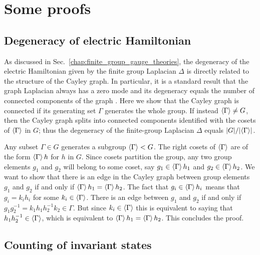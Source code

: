 \chapter{Some proofs}
\label{sec:some_proofs}

\section{Degeneracy of electric Hamiltonian}
\label{sec:laplacian degeneracy}

As discussed in Sec.~\ref{chap:finite_group_gauge_theories}, the degeneracy of the electric Hamiltonian given by the finite group Laplacian $\Delta$ is directly related to the structure of the Cayley graph.
In particular, it is a standard result that the graph Laplacian always has a zero mode and its degeneracy equals the number of connected components of the graph \cite{spectralgraphtheory}.
Here we show that the Cayley graph is connected if its generating set $\Gamma$ generates the whole group.
If instead $\expval{\Gamma} \neq G$, then the Cayley graph splits into connected components identified with the cosets of $\expval{\Gamma}$ in $G$; thus the degeneracy of the finite-group Laplacian $\Delta$ equals $\abs{G}/\abs{\expval{\Gamma}}$.

Any subset $\Gamma \in G$ generates a subgroup $\expval{\Gamma} < G$.
The right cosets of $\expval{\Gamma}$ are of the form $\expval{\Gamma} h$ for $h$ in $G$.
Since cosets partition the group, any two group elements $g_1$ and $g_2$ will belong to some coset, say $g_1 \in \expval{\Gamma} h_1$ and $g_2 \in \expval{\Gamma} h_2$.
We want to show that there is an edge in the Cayley graph between group elements $g_1$ and $g_2$ if and only if $\expval{\Gamma} h_1 = \expval{\Gamma} h_2$.
The fact that $g_i \in \expval{\Gamma} h_i$ means that $g_i = k_i h_i$ for some $k_i \in \expval{\Gamma}$.
There is an edge between $g_1$ and $g_2$ if and only if $g_1 g_2^{-1} = k_1 h_1 h_2^{-1} k_2 \in \Gamma$.
But since $k_i \in \expval{\Gamma}$ this is equivalent to saying that $h_1 h_2^{-1} \in \expval{\Gamma}$, which is equivalent to $\expval{\Gamma} h_1 = \expval{\Gamma} h_2$.
This concludes the proof.


\section{Counting of invariant states}\label{sec:counting invariant states}


